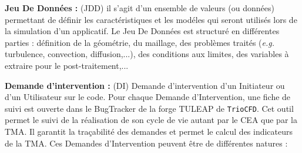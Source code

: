 \textbf{Jeu De Donn\'ees :} (JDD) il s'agit d'un ensemble de valeurs (ou donn\'ees) permettant de d\'efinir les caract\'eristiques et les mod\'eles qui seront utilis\'es lors de la simulation d'un applicatif. Le Jeu De Donn\'ees est structur\'e en diff\'erentes parties : d\'efinition de la g\'eom\'etrie, du maillage, des probl\`emes trait\'es (\textit{e.g.} turbulence, convection, diffusion,...), des conditions aux limites, des variables \`a extraire pour le post-traitement,...\smallskip\newline\newline

\textbf{Demande d'intervention :} (DI) Demande d'intervention d'un Initiateur ou d'un Utilisateur sur le code. Pour chaque Demande d'Intervention, une fiche de suivi est ouverte dans le BugTracker de la forge TULEAP de \texttt{TrioCFD}.
Cet outil permet le suivi de la r\'ealisation de son cycle de vie autant par le CEA que par la TMA. Il garantit la tra\c cabilit\'e des demandes et permet le calcul des indicateurs de la TMA. Ces Demandes d'Intervention peuvent \^etre de diff\'erentes natures :
